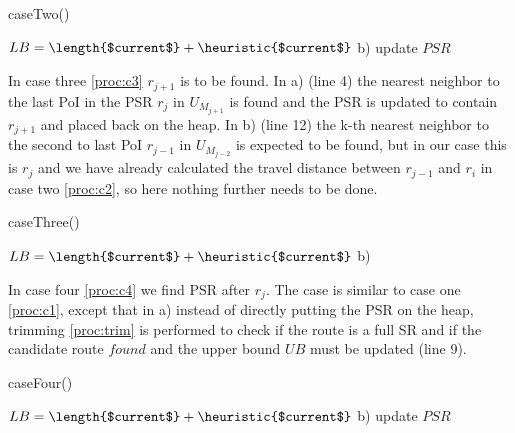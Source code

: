\begin{procedure}[H]
	\label{proc:c2}
	\caption{caseTwo()}
	
	$LB = \length{$current$} + \heuristic{$current$}$\;
	b) \;
	update $PSR$\;
\end{procedure}

In case three \ref{proc:c3} $r_{j+1}$ is to be found. In a) (line 4) the nearest neighbor to the last PoI in the PSR $r_j$ in $U_{M_{j+1}}$ is found and the PSR is updated to contain $r_{j+1}$ and placed back on the heap. In b) (line 12) the k-th nearest neighbor to the second to last PoI $r_{j-1}$ in $U_{M_{j-2}}$ is expected to be found, but in our case this is $r_j$ and we have already calculated the travel distance between $r_{j-1}$ and $r_i$ in case two \ref{proc:c2}, so here nothing further needs to be done.

\begin{procedure}[H]
	\label{proc:c3}
	\caption{caseThree()}
	
	$LB = \length{$current$} + \heuristic{$current$}$\;
	b) 
\end{procedure}

\pagebreak

In case four \ref{proc:c4} we find PSR after $r_j$. The case is similar to case one \ref{proc:c1}, except that in a) instead of directly putting the PSR on the heap, trimming \ref{proc:trim} is performed to check if the route is a full SR and if the candidate route $found$ and the upper bound $UB$ must be updated (line 9). 

\begin{procedure}[H]
	\label{proc:c4}
	\caption{caseFour()}
	
	$LB = \length{$current$} + \heuristic{$current$}$\;
	b) \;
	update $PSR$\;
\end{procedure}

